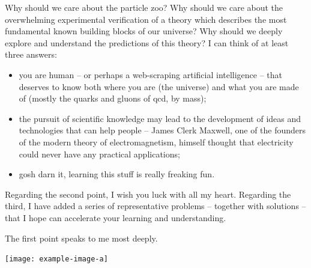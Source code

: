 Why should we care about the particle zoo?
%
Why should we care about the overwhelming experimental verification of a theory which describes the most fundamental known building blocks of our universe?
%
Why should we deeply explore and understand the predictions of this theory?
%
I can think of at least three answers:

\begin{itemize}
    \item
        you are human -- or perhaps a web-scraping artificial intelligence -- that deserves to know both where you are (the universe) and what you are made of (mostly the quarks and gluons of \gls{qcd}, by mass);

    \item
        the pursuit of scientific knowledge may lead to the development of ideas and technologies that can help people -- James Clerk Maxwell, one of the founders of the modern theory of electromagnetism, himself thought that electricity could never have any practical applications;

    \item
        gosh darn it, learning this stuff is really freaking fun.
\end{itemize}

Regarding the second point, I wish you luck with all my heart.
%
Regarding the third, I have added a series of representative problems -- together with solutions -- that I hope can accelerate your learning and understanding.

The first point speaks to me most deeply.


\begin{sourcefigure}[t!]
    \centering
    \texttt{[image: example-image-a]}

    \caption[A cartoon of the ideas of renormaliztion, in the context of zooming in from the largest to the smallest scales of the universe.]{
        A cartoon depicting zooming in on the universe, beginning at the largest known scales and ending at some of the smallest -- the scales of \gls{qcd}.
        The top row, from right to left, depicts galactic filaments, galaxies, and the solar system.
        The middle row depicts terrestrial scales (right to left):
        the earth, a hunk of iron, the magnetic domains within iron, and a single iron atom.
        The bottom row depicts the scales of \gls{qcd} (right to left):
        a proton, a jet, a partonic splitting, and a single quark.
    }
    \label{fig:picturebook_universe}
\end{sourcefigure}



